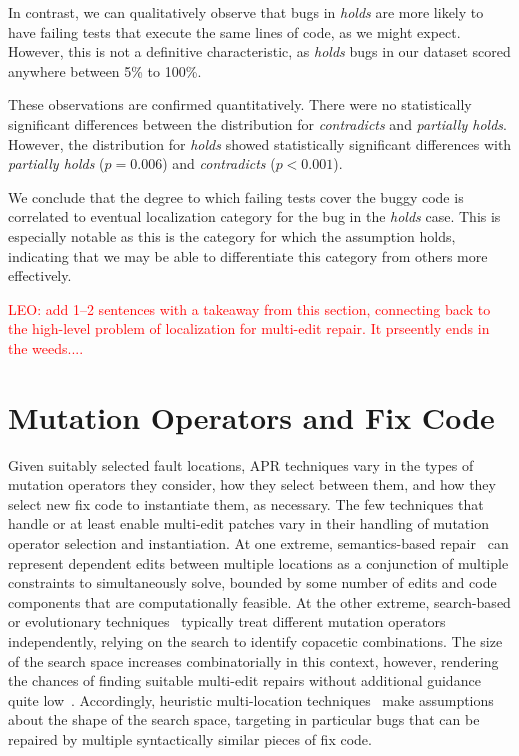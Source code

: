 \documentclass[10pt, conference]{IEEEtran}
\newcommand\todo[1]{\textcolor{red}{#1}}
\begin{document}
In contrast, we can qualitatively observe that bugs in \emph{holds} are more likely to have 
failing tests that execute the same lines of code, as we might expect. However, this is not a 
definitive characteristic, as \emph{holds} bugs in our dataset scored anywhere between 
5\% to 100\%.

These observations are confirmed quantitatively. There were no statistically significant 
differences between the distribution for \emph{contradicts} and \emph{partially holds}. 
However, the distribution for \emph{holds} showed statistically significant differences with 
\emph{partially holds} ($p = 0.006$)  and \emph{contradicts} ($p < 0.001$).

We conclude that the degree to which failing tests cover the buggy 
code is correlated to eventual localization category for the bug in the \emph{holds} case. 
This is especially notable as this is the category for which the assumption holds, indicating that 
we may be able to differentiate this category from others more effectively.

\todo{LEO: add 1--2 sentences with a takeaway from this section,
  connecting back to the high-level problem of localization for multi-edit
   repair.  It prseently ends in the weeds....}
 
\section{Mutation Operators and Fix Code}
\label{sec:mutops}

Given suitably selected fault locations, APR techniques vary in the types of
mutation operators they consider, how they select between them, and how they
select new fix code to instantiate them, as necessary. 
%
The few techniques that handle or at least enable multi-edit patches vary in their
handling of mutation operator selection and instantiation.  At one
extreme, semantics-based repair~\cite{s3,angelix} can represent dependent edits between multiple
locations as a conjunction of multiple constraints to simultaneously solve,
bounded by some number of edits and code components that are computationally feasible. 
At the other extreme, search-based or
evolutionary techniques~\cite{genprog,par} typically treat different mutation
operators independently, relying on the search to 
identify copacetic combinations.  The size of
the search space increases combinatorially in this context, however, rendering
the chances of finding suitable multi-edit repairs without additional guidance
quite low~\cite{ae,long-search-spaces}. Accordingly, heuristic multi-location
techniques~\cite{saha2019harnessing} make assumptions about the 
shape of the search space, 
targeting in particular bugs that can be repaired by multiple syntactically similar pieces of
fix code.
\end{document}
